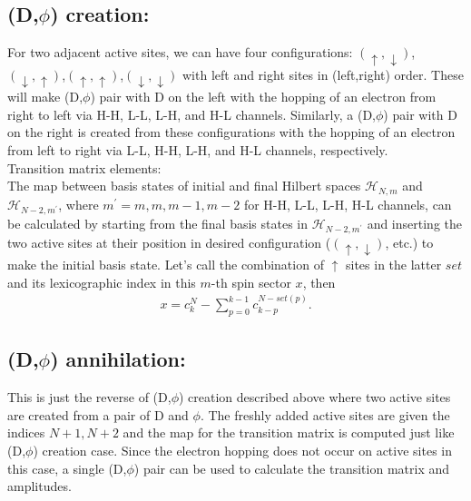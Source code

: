 \documentclass[a4paper]{revtex4-1} %
\newcommand{\da}{\downarrow}
\newcommand{\ua}{\uparrow}
\begin{document}
\subsection{(D,$\phi$) creation: }
For two adjacent active sites,
we can have four configurations:
$(\ua,\da)$, $(\da,\ua)$,$(\ua,\ua)$,$(\da,\da)$ with left and right sites in (left,right) order.
These will make (D,$\phi$) pair with D on the left 
with the hopping of an electron from right to left 
via H-H, L-L, L-H, and H-L channels.
Similarly,
a (D,$\phi$) pair with D on the right is created from these configurations
with the hopping of an electron from left to right
via L-L, H-H, L-H, and H-L channels, respectively.
\\Transition matrix elements:\\
The map between basis states of initial and final Hilbert spaces
$\mathcal{H}_{N,m}$ and $\mathcal{H}_{N-2,m^\prime}$, 
where $m^\prime=m,m,m-1,m-2$ for H-H, L-L, L-H, H-L channels,
can be calculated by starting from the final basis states in $\mathcal{H}_{N-2,m^\prime}$ 
and inserting the two active sites
at their position in desired configuration ($(\ua,\da)$, etc.) to make the initial basis state.
Let's call the combination of $\ua$ sites in the latter $set$ and its lexicographic index
 in this $m$-th spin sector $x$, then
\begin{gather}
x = c^N_ k - 
   \sum_{p=0}^{k-1}c^{N - set(p)}_{ k - p}.
 \end{gather}  





\subsection{(D,$\phi$) annihilation: }
This is just the reverse of (D,$\phi$) creation described above where two active sites are created
from a pair of D and $\phi$. The freshly added active sites are given the indices $N+1,N+2$
and the map for the transition matrix is computed just like (D,$\phi$) creation case.
Since the electron hopping does not occur on active sites in this case,
a single (D,$\phi$) pair can be used to calculate the transition matrix and amplitudes.
\end{document}
